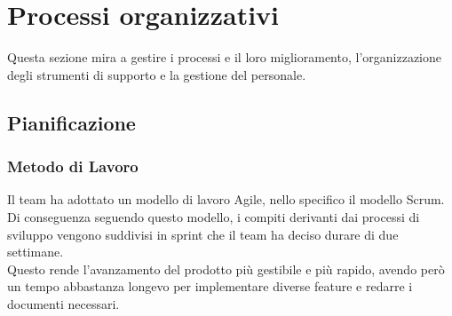 \section{Processi organizzativi}
Questa sezione mira a gestire i processi e il loro miglioramento, l'organizzazione degli strumenti
di supporto e la gestione del personale.

    \subsection{Pianificazione}
        \subsubsection{Metodo di Lavoro}
        Il team ha adottato un modello di lavoro Agile, nello specifico il modello Scrum.
        Di conseguenza seguendo questo modello, i compiti derivanti dai processi di sviluppo vengono suddivisi in sprint che il team ha deciso
        durare di due settimane.\\
        Questo rende l'avanzamento del prodotto più gestibile e più rapido, avendo però un tempo abbastanza longevo per implementare diverse
        feature e redarre i documenti necessari.
